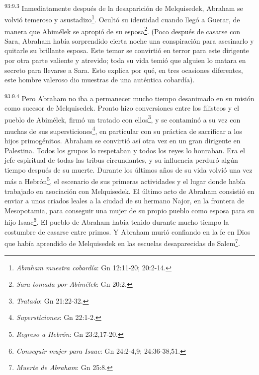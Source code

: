 \par
\textsuperscript{93:9.3} Inmediatamente después de la desaparición de Melquisedek, Abraham se volvió temeroso y asustadizo\footnote{\textit{Abraham muestra cobardía}: Gn 12:11-20; 20:2-14.}. Ocultó su identidad cuando llegó a Guerar, de manera que Abimélek se apropió de su esposa\footnote{\textit{Sara tomada por Abimélek}: Gn 20:2.}. (Poco después de casarse con Sara, Abraham había sorprendido cierta noche una conspiración para asesinarlo y quitarle su brillante esposa. Este temor se convirtió en terror para este dirigente por otra parte valiente y atrevido; toda su vida temió que alguien lo matara en secreto para llevarse a Sara. Esto explica por qué, en tres ocasiones diferentes, este hombre valeroso dio muestras de una auténtica cobardía).

\par
\textsuperscript{93:9.4} Pero Abraham no iba a permanecer mucho tiempo desanimado en su misión como sucesor de Melquisedek. Pronto hizo conversiones entre los filisteos y el pueblo de Abimélek, firmó un tratado con ellos\footnote{\textit{Tratado}: Gn 21:22-32.}, y se contaminó a su vez con muchas de sus supersticiones\footnote{\textit{Supersticiones}: Gn 22:1-2.}, en particular con su práctica de sacrificar a los hijos primogénitos. Abraham se convirtió así otra vez en un gran dirigente en Palestina. Todos los grupos lo respetaban y todos los reyes lo honraban. Era el jefe espiritual de todas las tribus circundantes, y su influencia perduró algún tiempo después de su muerte. Durante los últimos años de su vida volvió una vez más a Hebrón\footnote{\textit{Regreso a Hebrón}: Gn 23:2,17-20.}, el escenario de sus primeras actividades y el lugar donde había trabajado en asociación con Melquisedek. El último acto de Abraham consistió en enviar a unos criados leales a la ciudad de su hermano Najor, en la frontera de Mesopotamia, para conseguir una mujer de su propio pueblo como esposa para su hijo Isaac\footnote{\textit{Conseguir mujer para Isaac}: Gn 24:2-4,9; 24:36-38,51.}. El pueblo de Abraham había tenido durante mucho tiempo la costumbre de casarse entre primos. Y Abraham murió confiando en la fe en Dios que había aprendido de Melquisedek en las escuelas desaparecidas de Salem\footnote{\textit{Muerte de Abraham}: Gn 25:8.}.

